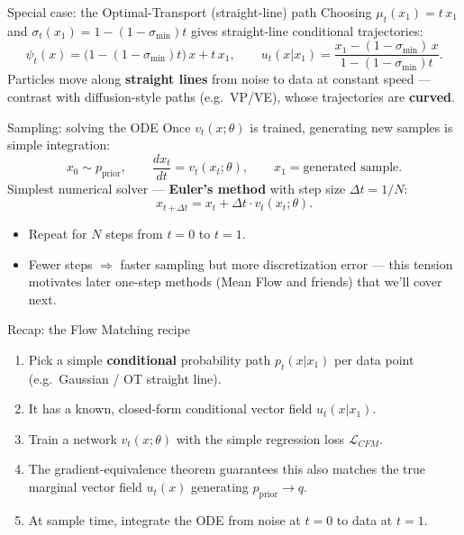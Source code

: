 \documentclass{beamer}
\begin{document}
\begin{frame}{Special case: the Optimal-Transport (straight-line) path}
Choosing $\mu_t(x_1) = t\,x_1$ and $\sigma_t(x_1) = 1-(1-\sigma_{\min})t$ gives straight-line conditional trajectories:
\[
\psi_t(x) = \big(1-(1-\sigma_{\min})t\big)\, x + t\, x_1, \qquad
u_t(x|x_1) = \frac{x_1 - (1-\sigma_{\min})\, x}{1-(1-\sigma_{\min})t}.
\]
Particles move along \textbf{straight lines} from noise to data at constant speed --- contrast with diffusion-style paths (e.g.\ VP/VE), whose trajectories are \textbf{curved}.
\begin{center}
\end{center}
\end{frame}

\begin{frame}{Sampling: solving the ODE}
Once $v_t(x;\theta)$ is trained, generating new samples is simple integration:
\[
x_0 \sim p_{\text{prior}}, \qquad \frac{dx_t}{dt} = v_t(x_t;\theta), \qquad x_1 = \text{generated sample}.
\]
Simplest numerical solver --- \textbf{Euler's method} with step size $\Delta t = 1/N$:
\[
x_{t+\Delta t} = x_t + \Delta t \cdot v_t(x_t;\theta).
\]
\begin{itemize}
\item Repeat for $N$ steps from $t=0$ to $t=1$.
\item Fewer steps $\Rightarrow$ faster sampling but more discretization error --- this tension motivates later one-step methods (Mean Flow and friends) that we'll cover next.
\end{itemize}
\end{frame}

\begin{frame}{Recap: the Flow Matching recipe}
\begin{enumerate}
\item Pick a simple \textbf{conditional} probability path $p_t(x|x_1)$ per data point (e.g.\ Gaussian / OT straight line).
\item It has a known, closed-form conditional vector field $u_t(x|x_1)$.
\item Train a network $v_t(x;\theta)$ with the simple regression loss $\mathcal{L}_{CFM}$.
\item The gradient-equivalence theorem guarantees this also matches the true marginal vector field $u_t(x)$ generating $p_{\text{prior}} \to q$.
\item At sample time, integrate the ODE from noise at $t=0$ to data at $t=1$.
\end{enumerate}
\end{frame}
\end{document}
